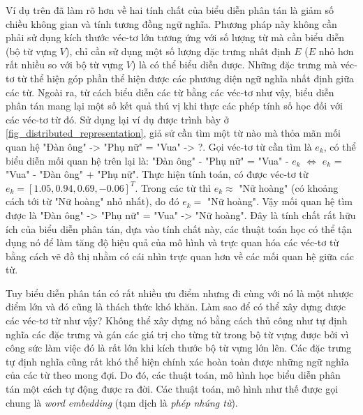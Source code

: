 Ví dụ trên đã làm rõ hơn về hai tính chất của biểu diễn phân tán là giảm số chiều không gian và tính tương đồng ngữ nghĩa. Phương pháp này không cần phải sử dụng kích thước véc-tơ lớn tương ứng với số lượng từ mà cần biểu diễn (bộ từ vựng $V$), chỉ cần sử dụng một số lượng đặc trưng nhât định $E$ ($E$ nhỏ hơn rất nhiều so với bộ từ vựng $V$) là có thể biểu diễn được. Những đặc trưng mà véc-tơ từ thể hiện góp phần thể hiện được các phương diện ngữ nghĩa nhất định giữa các từ. Ngoài ra, từ cách biểu diễn các từ bằng các véc-tơ như vậy, biểu diễn phân tán mang lại một số kết quả thú vị khi thực các phép tính số học đối với các véc-tơ từ đó. Sử dụng lại ví dụ được trình bày ở \ref{fig_distributed_representation}, giả sử cần tìm một từ nào mà thỏa mãn mối quan hệ "Đàn ông" -> "Phụ nữ" = "Vua" -> ?. 	Gọi véc-tơ từ cần tìm là $e_k$, có thể biểu diễn mối quan hệ trên lại là: "Đàn ông" - "Phụ nữ" = "Vua" - $e_k$ $\Leftrightarrow$ $e_k$ = "Vua" - "Đàn ông" + "Phụ nữ". Thực hiện tính toán, có được véc-tơ từ $e_k = \left[ 1.05, 0.94, 0.69, -0.06\right]^T$. Trong các từ thì $e_k \approx$ "Nữ hoàng" (có khoảng cách tới từ "Nữ hoàng" nhỏ nhất), do đó $e_k =$ "Nữ hoàng". Vậy mối quan hệ tìm được là "Đàn ông" -> "Phụ nữ" = "Vua" -> "Nữ hoàng". Đây là tính chất rất hữu ích của biểu diễn phân tán, dựa vào tính chất này, các thuật toán học có thể tận dụng nó để làm tăng độ hiệu quả của mô hình và trực quan hóa các véc-tơ từ bằng cách vẽ đồ thị nhằm có cái nhìn trực quan hơn về các mối quan hệ giữa các từ.

Tuy biểu diễn phân tán có rất nhiều ưu điểm nhưng đi cùng với nó là một nhược điểm lớn và đó cũng là thách thức khó khăn. Làm sao để có thể xây dựng được các véc-tơ từ như vậy? Không thể xây dựng nó bằng cách thủ công như tự định nghĩa các đặc trưng và gán các giá trị cho từng từ trong bộ từ vựng được bởi vì công sức làm việc đó là rất lớn khi kích thước bộ từ vựng lớn lên. Các đặc trưng tự định nghĩa cũng rất khó thể hiện chính xác hoàn toàn được những ngữ nghĩa của các từ theo mong đợi. Do đó, các thuật toán, mô hình học biểu diễn phân tán một cách tự động được ra đời. Các thuật toán, mô hình như thế được gọi chung là \textit{word embedding} (tạm dịch là \textit{phép nhúng từ}).

